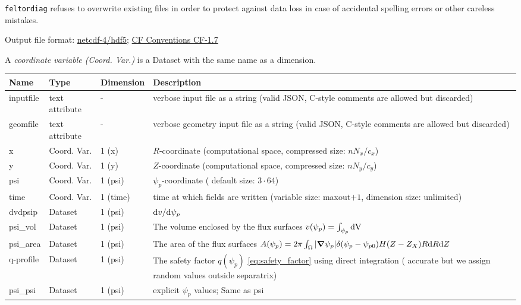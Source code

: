 \begin{tcolorbox}[title=Note]
\texttt{feltordiag} refuses to overwrite existing files in order to protect against data loss in case of accidental spelling
errors or other careless mistakes.
\end{tcolorbox}

Output file format: \href{https://www.unidata.ucar.edu/software/netcdf/docs/}{netcdf-4/hdf5};
\href{http://cfconventions.org/Data/cf-conventions/cf-conventions-1.7/cf-conventions.html}{CF Conventions CF-1.7}

A \textit{coordinate variable (Coord. Var.)} is a Dataset with the same name as a dimension.

\begin{longtable}{lll>{\RaggedRight}p{7cm}}
\toprule
\rowcolor{gray!50}\textbf{Name} &  \textbf{Type} & \textbf{Dimension} & \textbf{Description}  \\ \midrule
inputfile  &     text attribute & - & verbose input file as a string (valid JSON, C-style comments are allowed but discarded) \\
geomfile   &     text attribute & - & verbose geometry input file as a string (valid JSON, C-style comments are allowed but discarded) \\
x                & Coord. Var. & 1 (x) & $R$-coordinate (computational space, compressed size: $nN_x/c_x$)\\
y                & Coord. Var. & 1 (y) & $Z$-coordinate (computational space, compressed size: $nN_y/c_y$)\\
psi              & Coord. Var. & 1 (psi) & $\psi_p$-coordinate ( default size: $3\cdot 64$) \\
time             & Coord. Var. & 1 (time)& time at which fields are written (variable size: maxout$+1$, dimension size: unlimited) \\
dvdpsip          & Dataset & 1 (psi) & $\mathrm{d} v/\mathrm{d}\psi_p$ \\
psi\_vol         & Dataset & 1 (psi) & The volume enclosed by the flux surfaces $v(\psi_p) = \int_{\psi_p} \mathrm{dV}\, $ \\
psi\_area        & Dataset & 1 (psi) & The area of the flux surfaces $A(\psi_p) = 2\pi \int_\Omega |{\boldsymbol{\nabla}}\psi_p| \delta(\psi_p - \psi_{p0}) H(Z-Z_X) R\mathrm{d} R\mathrm{d} Z$ \\
q-profile        & Dataset & 1 (psi) & The safety factor $q(\psi_p)$ \eqref{eq:safety_factor} using direct integration ( accurate but we assign random values outside separatrix) \\
psi\_psi         & Dataset & 1 (psi) & explicit $\psi_p$ values; Same as psi \\

\end{longtable}
